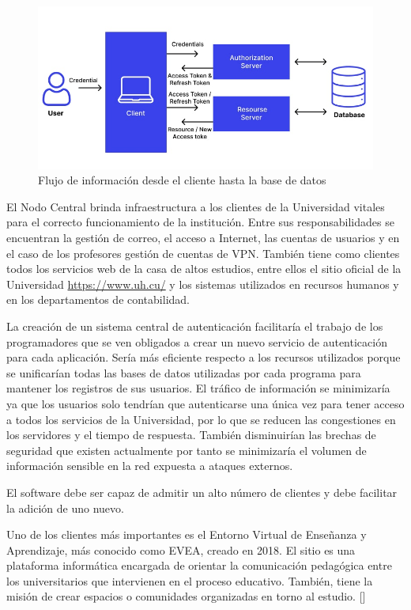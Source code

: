 \begin{figure}[H]
	\centering
	\includegraphics[width=0.9\linewidth]{Graphics/token-based-auth}
	\caption{Flujo de información desde el cliente hasta la base de datos}
	\label{fig:token-based-auth}
\end{figure}

El Nodo Central brinda infraestructura a los clientes de la Universidad vitales para el correcto funcionamiento de la institución. Entre sus responsabilidades se encuentran la gestión de correo, el acceso a Internet, las cuentas de usuarios y en el caso de los profesores gestión de cuentas de VPN. También tiene como clientes todos los servicios web de la casa de altos estudios, entre ellos el sitio oficial de la Universidad \url{https://www.uh.cu/} y los sistemas utilizados en recursos humanos y en los departamentos de contabilidad.

La creación de un sistema central de autenticación facilitaría el trabajo de los programadores que se ven obligados a crear un nuevo servicio de autenticación para cada aplicación. Sería más eficiente respecto a los recursos utilizados porque se unificarían todas las bases de datos utilizadas por cada programa para mantener los registros de sus usuarios. El tráfico de información se minimizaría ya que los usuarios solo tendrían que autenticarse una única vez para tener acceso a todos los servicios de la Universidad, por lo que se reducen las congestiones en los servidores y el tiempo de respuesta. También disminuirían las brechas de seguridad que existen actualmente por tanto se minimizaría el volumen de información sensible en la red expuesta a ataques externos.

El software debe ser capaz de admitir un alto número de clientes y debe facilitar la adición de uno nuevo.

Uno de los clientes más importantes es el Entorno Virtual de Enseñanza y Aprendizaje, más conocido como EVEA, creado en 2018. El sitio es una plataforma informática encargada de orientar la comunicación pedagógica entre los universitarios que intervienen en el proceso educativo. También, tiene la misión de crear espacios o comunidades organizadas en torno al estudio. [\cite{evea-cd}] 

